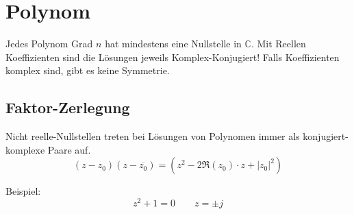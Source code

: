 \section{Polynom}
Jedes Polynom Grad $n$ hat mindestens eine Nullstelle in $\mathbb{C}$. Mit Reellen Koeffizienten sind die Lösungen jeweils Komplex-Konjugiert! Falls Koeffizienten komplex sind, gibt es keine Symmetrie.

\subsection{Faktor-Zerlegung}
Nicht reelle-Nullstellen treten bei Lösungen von Polynomen immer als konjugiert-komplexe Paare auf.
\[
(z - z_0)(z-\overline{z_0}) = (z^2 - 2\Re(z_0)\cdot z + \left|z_0\right|^2)
\]

\noindent Beispiel:
\[z^2 + 1 = 0 \qquad z=\pm j\]
